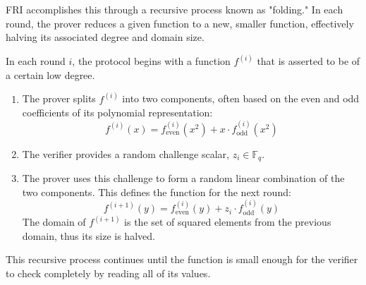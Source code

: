 \documentclass{article}
\begin{document}
FRI accomplishes this through a recursive process known as "folding." In each round, the prover reduces a given function to a new, smaller function, effectively halving its associated degree and domain size.

\begin{tcolorbox}[breakable, title={The FRI Folding Step}]
In each round $i$, the protocol begins with a function $f^{(i)}$ that is asserted to be of a certain low degree.
\begin{enumerate}
    \item The prover splits $f^{(i)}$ into two components, often based on the even and odd coefficients of its polynomial representation:
    \[ f^{(i)}(x) = f^{(i)}_{\text{even}}(x^2) + x \cdot f^{(i)}_{\text{odd}}(x^2) \]
    \item The verifier provides a random challenge scalar, $z_i \in \mathbb{F}_q$.
    \item The prover uses this challenge to form a random linear combination of the two components. This defines the function for the next round:
    \[ f^{(i+1)}(y) = f^{(i)}_{\text{even}}(y) + z_i \cdot f^{(i)}_{\text{odd}}(y) \]
    The domain of $f^{(i+1)}$ is the set of squared elements from the previous domain, thus its size is halved.
\end{enumerate}

This recursive process continues until the function is small enough for the verifier to check completely by reading all of its values.
\end{tcolorbox}
\end{document}
